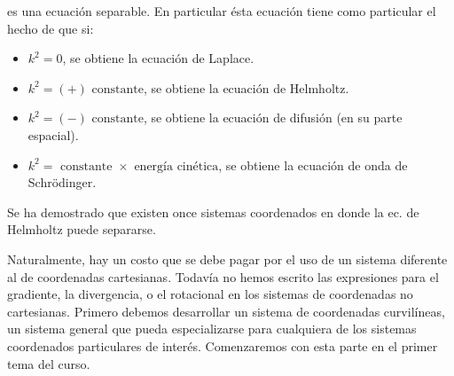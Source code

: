 es una ecuación separable.  En particular ésta ecuación tiene como particular el hecho de que si:
\begin{itemize}
\item $k^{2} = 0$, se obtiene la ecuación de Laplace.
\item $k^{2} = (+) \mbox{ constante}$, se obtiene la ecuación de Helmholtz.
\item $k^{2} = (-) \mbox{ constante}$, se obtiene la ecuación de difusión (en su parte espacial).
\item $k^{2} = \mbox{ constante } \times \mbox{ energía cinética}$, se obtiene la ecuación de onda de Schrödinger.
\end{itemize}
Se ha demostrado que existen once sistemas coordenados en donde la ec. de Helmholtz puede separarse. 
\par
Naturalmente, hay un costo que se debe pagar por el uso de un sistema diferente al de coordenadas cartesianas. Todavía no hemos escrito las expresiones para el gradiente, la divergencia, o el rotacional en los sistemas de coordenadas no cartesianas. Primero debemos desarrollar un sistema de coordenadas curvilíneas, un sistema general que pueda especializarse para cualquiera de los sistemas coordenados particulares de interés. Comenzaremos con esta parte en el primer tema del curso. 
